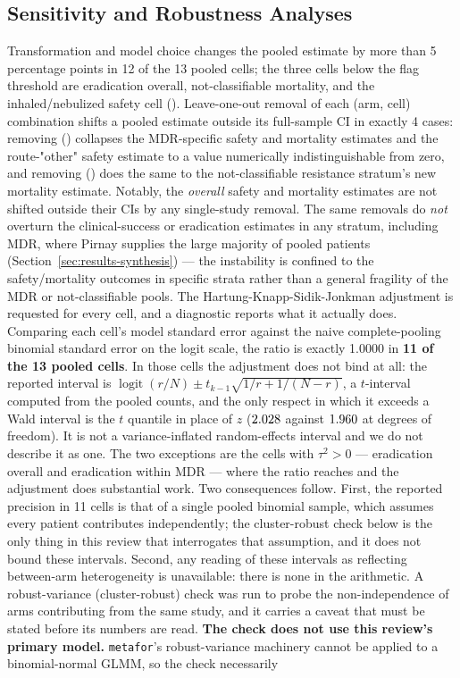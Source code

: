 \subsection{Sensitivity and Robustness Analyses}
\label{sec:results-robustness}

Transformation and model choice changes the pooled estimate by more than 5 percentage points in 12 of the 13 pooled cells; the three cells below the flag threshold are eradication overall, not-classifiable mortality, and the inhaled/nebulized safety cell (). Leave-one-out removal of each (arm, cell) combination shifts a pooled estimate outside its full-sample CI in exactly 4 cases: removing \citeauthor{Pirnay2024_natmicrobiol} (\citeyear{Pirnay2024_natmicrobiol}) collapses the MDR-specific safety and mortality estimates and the route-"other" safety estimate to a value numerically indistinguishable from zero, and removing \citeauthor{Jault2019_phagoburn} (\citeyear{Jault2019_phagoburn}) does the same to the not-classifiable resistance stratum's new mortality estimate. Notably, the \emph{overall} safety and mortality estimates are not shifted outside their CIs by any single-study removal. The same removals do \emph{not} overturn the clinical-success or eradication estimates in any stratum, including MDR, where Pirnay supplies the large majority of pooled patients (Section~\ref{sec:results-synthesis}) --- the instability is confined to the safety/mortality outcomes in specific strata rather than a general fragility of the MDR or not-classifiable pools. The Hartung-Knapp-Sidik-Jonkman adjustment is requested for every cell, and a diagnostic reports what it actually does. Comparing each cell's model standard error against the naive complete-pooling binomial standard error on the logit scale, the ratio is exactly 1.0000 in \textbf{11 of the 13 pooled cells}. In those cells the adjustment does not bind at all: the reported interval is $\operatorname{logit}(r/N) \pm t_{k-1}\sqrt{1/r + 1/(N-r)}$, a $t$-interval computed from the pooled counts, and the only respect in which it exceeds a Wald interval is the $t$ quantile in place of $z$ ($2.028$ against $1.960$ at \TQuantileDf degrees of freedom). It is not a variance-inflated random-effects interval and we do not describe it as one. The two exceptions are the cells with $\tau^2 > 0$ --- eradication overall and eradication within MDR --- where the ratio reaches \HkMaxRatio and the adjustment does substantial work. Two consequences follow. First, the reported precision in 11 cells is that of a single pooled binomial sample, which assumes every patient contributes independently; the cluster-robust check below is the only thing in this review that interrogates that assumption, and it does not bound these intervals. Second, any reading of these intervals as reflecting between-arm heterogeneity is unavailable: there is none in the arithmetic. A robust-variance (cluster-robust) check was run to probe the non-independence of arms contributing from the same study, and it carries a caveat that must be stated before its numbers are read. \textbf{The check does not use this review's primary model.} \texttt{metafor}'s robust-variance machinery cannot be applied to a binomial-normal GLMM, so the check necessarily 
